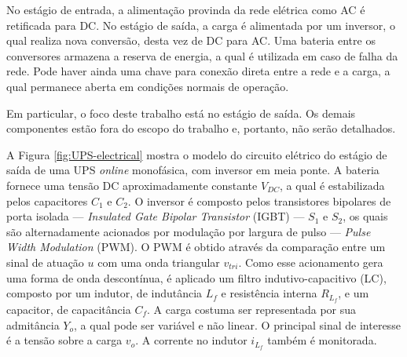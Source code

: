 \documentclass[repeatfields,oneside]{tcc}
\begin{document}
No estágio de entrada, a alimentação provinda da rede elétrica como AC é retificada para DC.
No estágio de saída, a carga é alimentada por um inversor, o qual realiza nova conversão, desta vez de DC para AC.
Uma bateria entre os conversores armazena a reserva de energia, a qual é utilizada em caso de falha da rede.
Pode haver ainda uma chave para conexão direta entre a rede e a carga, a qual permanece aberta em condições normais de operação.

Em particular, o foco deste trabalho está no estágio de saída.
Os demais componentes estão fora do escopo do trabalho e, portanto, não serão detalhados.

A Figura \ref{fig:UPS-electrical} mostra o modelo do circuito elétrico do estágio de saída de uma UPS \textit{online} monofásica, com inversor em meia ponte.
A bateria fornece uma tensão DC aproximadamente constante $V_{DC}$, a qual é estabilizada pelos capacitores $C_1$ e $C_2$.
O inversor é composto pelos transistores bipolares de porta isolada --- \textit{Insulated Gate Bipolar Transistor} (IGBT) --- $S_1$ e $S_2$, os quais são alternadamente acionados por modulação por largura de pulso --- \textit{Pulse Width Modulation} (PWM).
O PWM é obtido através da comparação entre um sinal de atuação $u$ com uma onda triangular $v_{tri}$.
Como esse acionamento gera uma forma de onda descontínua, é aplicado um filtro indutivo-capacitivo (LC), composto por um indutor, de indutância $L_f$ e resistência interna $R_{L_f}$, e um capacitor, de capacitância $C_f$.
A carga costuma ser representada por sua admitância $Y_o$, a qual pode ser variável e não linear.
O principal sinal de interesse é a tensão sobre a carga $v_o$.
A corrente no indutor $i_{L_f}$ também é monitorada.
\end{document}
